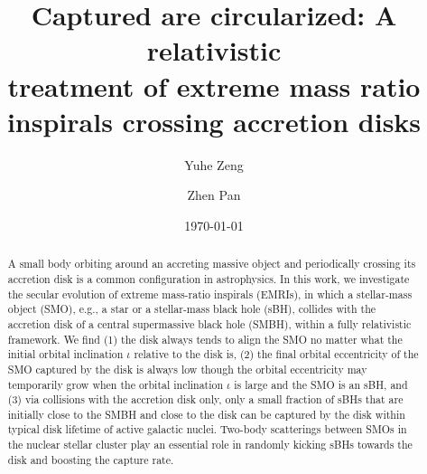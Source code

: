 \documentclass[aps,prx,reprint,superscriptaddress,nofootinbib,longbibliography]{revtex4-1}
\begin{document}
\title{Captured are circularized:  A relativistic \\ treatment  of extreme mass ratio inspirals crossing accretion disks}
\author{Yuhe Zeng}


\author{Zhen Pan}


\begin{abstract}
 A small body orbiting around an accreting massive object and periodically crossing its accretion disk is a common configuration in astrophysics. In this work, we investigate the secular evolution of extreme mass-ratio inspirals (EMRIs), in which a stellar-mass object (SMO), e.g., a star or a stellar-mass black hole (sBH), collides with the accretion disk of a central supermassive black hole (SMBH), within a fully relativistic framework. We find (1) the disk always tends to align the SMO no matter what the initial orbital inclination $\iota$ relative to the disk is, (2) the final orbital eccentricity
 of the SMO captured by the disk is always low though the orbital eccentricity may temporarily grow when the orbital inclination $\iota$ is large and the SMO is an sBH,
 and (3) via collisions with the accretion disk only, only a small fraction of sBHs that are initially close to the SMBH and close to the disk can be captured by the disk within typical disk lifetime of active galactic nuclei. Two-body scatterings between SMOs in the nuclear stellar cluster play an essential role in randomly kicking sBHs towards the disk and boosting the capture rate.
\end{abstract}
\date{\today}

\maketitle
\end{document}
